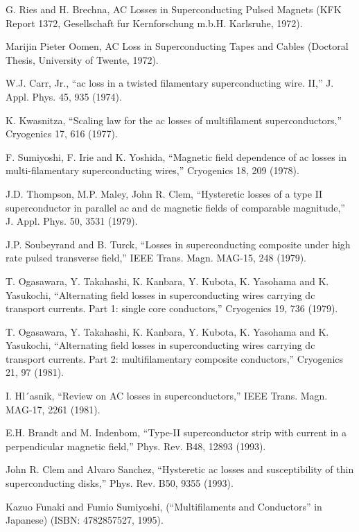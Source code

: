 \noindent [7.4] G. Ries and H. Brechna, AC Losses in Superconducting Pulsed Magnets (KFK Report 1372, Gesellschaft fur Kernforschung m.b.H. Karlsruhe, 1972).

\noindent [7.5] Marijin Pieter Oomen, AC Loss in Superconducting Tapes and Cables (Doctoral Thesis, University of Twente, 1972).

\noindent [7.6] W.J. Carr, Jr., ``ac loss in a twisted filamentary superconducting wire. II,” J. Appl. Phys. 45, 935 (1974).

\noindent [7.7] K. Kwasnitza, ``Scaling law for the ac losses of multifilament superconductors,”
Cryogenics 17, 616 (1977).

\noindent [7.8] F. Sumiyoshi, F. Irie and K. Yoshida, ``Magnetic field dependence of ac losses in
multi-filamentary superconducting wires,” Cryogenics 18, 209 (1978).

\noindent [7.9] J.D. Thompson, M.P. Maley, John R. Clem, ``Hysteretic losses of a type II superconductor
in parallel ac and dc magnetic fields of comparable magnitude,” J. Appl.
Phys. 50, 3531 (1979).

\noindent [7.10] J.P. Soubeyrand and B. Turck, ``Losses in superconducting composite under high rate pulsed transverse field,” IEEE Trans. Magn. MAG-15, 248 (1979).

\noindent [7.11] T. Ogasawara, Y. Takahashi, K. Kanbara, Y. Kubota, K. Yasohama and K. Yasukochi,
``Alternating field losses in superconducting wires carrying dc transport
currents. Part 1: single core conductors,” Cryogenics 19, 736 (1979).

\noindent [7.12] T. Ogasawara, Y. Takahashi, K. Kanbara, Y. Kubota, K. Yasohama and K. Yasukochi, ``Alternating field losses in superconducting wires carrying dc transport currents. Part 2: multifilamentary composite conductors,” Cryogenics 21, 97 (1981).

\noindent [7.13] I. Hl´asnik, ``Review on AC losses in superconductors,” IEEE Trans. Magn. MAG-17, 2261 (1981).

\noindent [7.14] E.H. Brandt and M. Indenbom, ``Type-II superconductor strip with current in a perpendicular magnetic field,” Phys. Rev. B48, 12893 (1993).

\noindent [7.15] John R. Clem and Alvaro Sanchez, ``Hysteretic ac losses and susceptibility of thin superconducting disks,” Phys. Rev. B50, 9355 (1993).

\noindent [7.16] Kazuo Funaki and Fumio Sumiyoshi, (``Multifilaments and Conductors” in Japanese) (ISBN: 4782857527, 1995).

